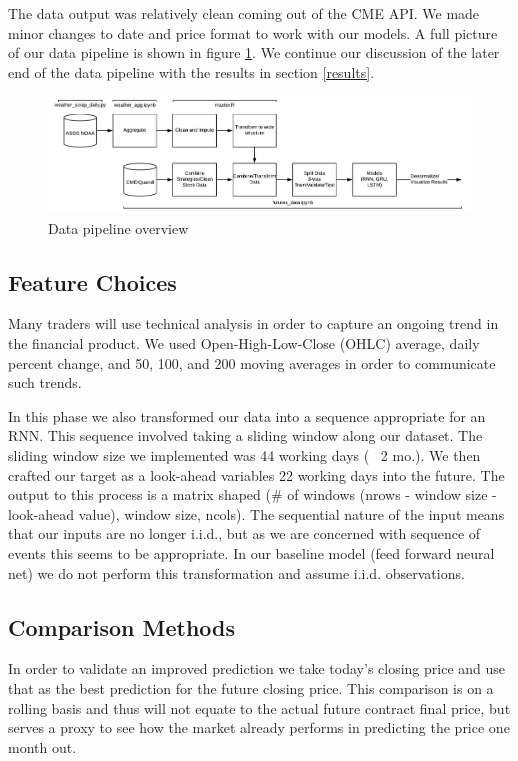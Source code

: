\documentclass[twoside,11pt]{article}
\begin{document}
The data output was relatively clean coming out of the CME API. We made minor changes to date and price format to work with our models. A full picture of our data pipeline is shown in figure \ref{fig:datapipeline}. We continue our discussion of the later end of the data pipeline with the results in section \ref{results}.

	\begin{figure}[htbp]
	\centering
	\includegraphics[width=5in]{DataPipeline.png}
	\caption{Data pipeline overview}
	\label{fig:datapipeline}
\end{figure}

\subsection{Feature Choices}

Many traders will use technical analysis in order to capture an ongoing trend in the financial product. We used Open-High-Low-Close (OHLC) average, daily percent change, and 50, 100, and 200 moving averages in order to communicate such trends.  

In this phase we also transformed our data into a sequence appropriate for an RNN. This sequence involved taking a sliding window along our dataset. The sliding window size we implemented was 44 working days (~ 2 mo.). We then crafted our target as a look-ahead variables 22 working days into the future. The output to this process is a matrix shaped (\# of windows (nrows - window size - look-ahead value), window size, ncols). The sequential nature of the input means that our inputs are no longer i.i.d., but as we are concerned with sequence of events this seems to be appropriate. In our baseline model (feed forward neural net) we do not perform this transformation and assume i.i.d. observations. 

\subsection{Comparison Methods}

In order to validate an improved prediction we take today's closing price and use that as the best prediction for the future closing price. This comparison is on a rolling basis and thus will not equate to the actual future contract final price, but serves a proxy to see how the market already performs  in predicting the price one month out. 
\end{document}
